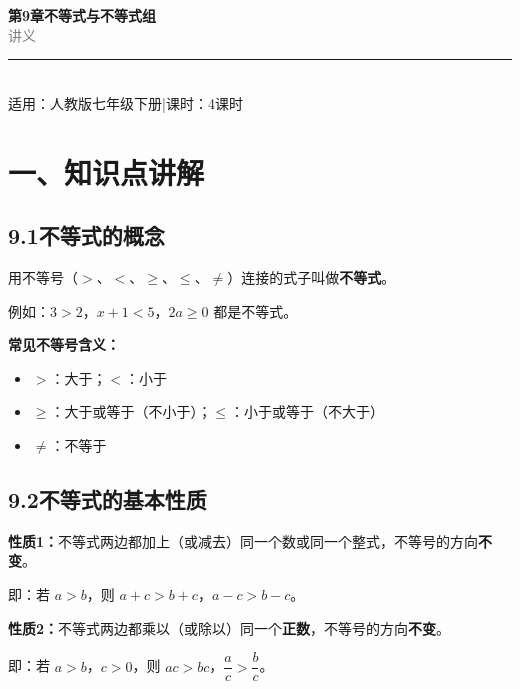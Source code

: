 \documentclass[12pt, a4paper]{ctexart}
\begin{document}
\begin{center}
{\Huge\bfseries\textcolor{mainblue}{第9章\quad 不等式与不等式组}}\\[12pt]
{\Large\textcolor{gray}{讲\quad 义}}\\[8pt]
\rule{0.6\textwidth}{1pt}\\[8pt]
{\normalsize 适用：人教版\quad 七年级下册\quad |\quad 课时：4课时}
\end{center}
\vspace{10pt}

\section*{\textcolor{mainblue}{一、知识点讲解}}

\subsection*{9.1\quad 不等式的概念}

\begin{knowledgebox}[9.1.1 不等式]
用不等号（$>$、$<$、$\geqslant$、$\leqslant$、$\neq$）连接的式子叫做\textbf{不等式}。

例如：$3 > 2$，$x + 1 < 5$，$2a \geqslant 0$ 都是不等式。

\vspace{4pt}
\textbf{常见不等号含义：}
\begin{itemize}[leftmargin=2em]
  \item $>$：大于；\quad $<$：小于
  \item $\geqslant$：大于或等于（不小于）；\quad $\leqslant$：小于或等于（不大于）
  \item $\neq$：不等于
\end{itemize}
\end{knowledgebox}

\subsection*{9.2\quad 不等式的基本性质}

\begin{knowledgebox}[9.2.1 不等式的基本性质1]
\textbf{性质1：}不等式两边都加上（或减去）同一个数或同一个整式，不等号的方向\textbf{不变}。

即：若 $a > b$，则 $a + c > b + c$，$a - c > b - c$。
\end{knowledgebox}

\begin{knowledgebox}[9.2.2 不等式的基本性质2]
\textbf{性质2：}不等式两边都乘以（或除以）同一个\textbf{正数}，不等号的方向\textbf{不变}。

即：若 $a > b$，$c > 0$，则 $ac > bc$，$\dfrac{a}{c} > \dfrac{b}{c}$。
\end{knowledgebox}
\end{document}
